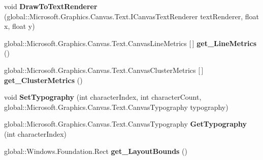 \begin{DoxyCompactItemize}
\item 
\mbox{\label{interface_microsoft_1_1_graphics_1_1_canvas_1_1_text_1_1_i_canvas_text_layout_a97cc5738dc8df87ea520f6446b3f5053}} 
void {\bfseries Draw\+To\+Text\+Renderer} (global\+::\+Microsoft.\+Graphics.\+Canvas.\+Text.\+I\+Canvas\+Text\+Renderer text\+Renderer, float x, float y)
\item 
\mbox{\label{interface_microsoft_1_1_graphics_1_1_canvas_1_1_text_1_1_i_canvas_text_layout_aed7ad1845a233070df02e428dca2f7c2}} 
global\+::\+Microsoft.\+Graphics.\+Canvas.\+Text.\+Canvas\+Line\+Metrics \mbox{[}$\,$\mbox{]} {\bfseries get\+\_\+\+Line\+Metrics} ()
\item 
\mbox{\label{interface_microsoft_1_1_graphics_1_1_canvas_1_1_text_1_1_i_canvas_text_layout_a5be8b44c03e366473263dacc72514c1f}} 
global\+::\+Microsoft.\+Graphics.\+Canvas.\+Text.\+Canvas\+Cluster\+Metrics \mbox{[}$\,$\mbox{]} {\bfseries get\+\_\+\+Cluster\+Metrics} ()
\item 
\mbox{\label{interface_microsoft_1_1_graphics_1_1_canvas_1_1_text_1_1_i_canvas_text_layout_a882229f7daee747656cede530df97f13}} 
void {\bfseries Set\+Typography} (int character\+Index, int character\+Count, global\+::\+Microsoft.\+Graphics.\+Canvas.\+Text.\+Canvas\+Typography typography)
\item 
\mbox{\label{interface_microsoft_1_1_graphics_1_1_canvas_1_1_text_1_1_i_canvas_text_layout_a75787883a628465c1be818d21a9828f6}} 
global\+::\+Microsoft.\+Graphics.\+Canvas.\+Text.\+Canvas\+Typography {\bfseries Get\+Typography} (int character\+Index)
\item 
\mbox{\label{interface_microsoft_1_1_graphics_1_1_canvas_1_1_text_1_1_i_canvas_text_layout_af55ce4a21c46a7f5089b4dbbbd66f336}} 
global\+::\+Windows.\+Foundation.\+Rect {\bfseries get\+\_\+\+Layout\+Bounds} ()
\item 

\end{DoxyCompactItemize}
